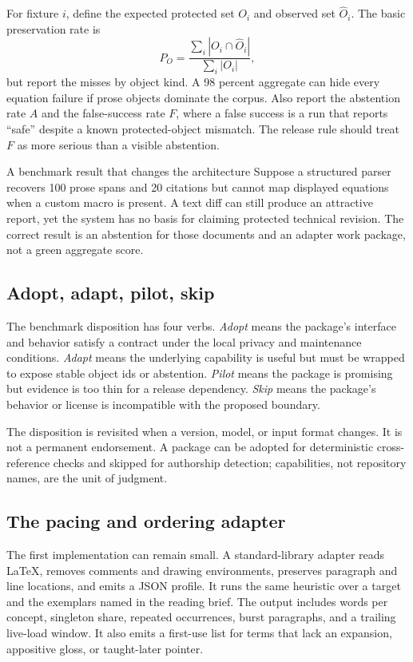 For fixture $i$, define the expected protected set $O_i$ and observed set
$\widehat O_i$. The basic preservation rate is
\[
  P_O=\frac{\sum_i |O_i\cap\widehat O_i|}{\sum_i |O_i|},
\]
but report the misses by object kind. A 98 percent aggregate can hide every
equation failure if prose objects dominate the corpus. Also report the
abstention rate $A$ and the false-success rate $F$, where a false success is a
run that reports ``safe'' despite a known protected-object mismatch. The
release rule should treat $F$ as more serious than a visible abstention.

\begin{cardexample}{A benchmark result that changes the architecture}
Suppose a structured parser recovers 100 prose spans and 20 citations but
cannot map displayed equations when a custom macro is present. A text diff
can still produce an attractive report, yet the system has no basis for
claiming protected technical revision. The correct result is an abstention for
those documents and an adapter work package, not a green aggregate score.
\end{cardexample}

\subsection{Adopt, adapt, pilot, skip}

The benchmark disposition has four verbs. \emph{Adopt} means the package's
interface and behavior satisfy a contract under the local privacy and
maintenance conditions. \emph{Adapt} means the underlying capability is
useful but must be wrapped to expose stable object ids or abstention.
\emph{Pilot} means the package is promising but evidence is too thin for a
release dependency. \emph{Skip} means the package's behavior or license is
incompatible with the proposed boundary.

The disposition is revisited when a version, model, or input format changes.
It is not a permanent endorsement. A package can be adopted for deterministic
cross-reference checks and skipped for authorship detection; capabilities, not
repository names, are the unit of judgment.

\subsection{The pacing and ordering adapter}
\label{app:pacing-adapter}

The first implementation can remain small. A standard-library adapter reads
LaTeX, removes comments and drawing environments, preserves paragraph and line
locations, and emits a JSON profile. It runs the same heuristic over a target
and the exemplars named in the reading brief. The output includes words per
concept, singleton share, repeated occurrences, burst paragraphs, and a
trailing live-load window. It also emits a first-use list for terms that lack
an expansion, appositive gloss, or taught-later pointer.

